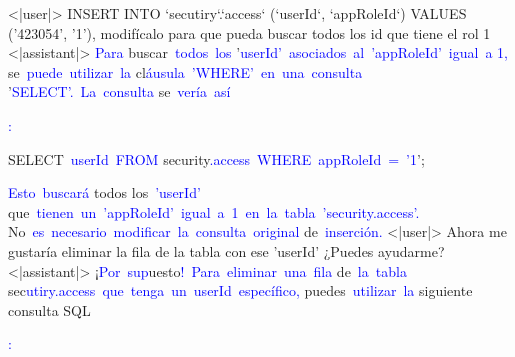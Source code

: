 \documentclass{article}
\begin{document}
\begin{tcolorbox}[colframe=black,colback=white]
<|user|>
INSERT INTO `secutiry`.`access` (`userId`, `appRoleId`) VALUES
('423054', '1'),  modifícalo para que pueda buscar todos los id que tiene el rol 1
<|assistant|>
\textcolor{blue}{Para} buscar\textcolor{blue}{~todos}\textcolor{blue}{~los} '\textcolor{blue}{userId}\textcolor{blue}{'}\textcolor{blue}{~asoci}\textcolor{blue}{ados}\textcolor{blue}{~al}\textcolor{blue}{~'}\textcolor{blue}{app}\textcolor{blue}{RoleId}\textcolor{blue}{'}\textcolor{blue}{~igual}\textcolor{blue}{~a} \textcolor{blue}{1}\textcolor{blue}{,} se\textcolor{blue}{~puede}\textcolor{blue}{~utilizar}\textcolor{blue}{~la} cl\textcolor{blue}{á}\textcolor{blue}{us}\textcolor{blue}{ula}\textcolor{blue}{~'}\textcolor{blue}{WHERE}\textcolor{blue}{'}\textcolor{blue}{~en}\textcolor{blue}{~una}\textcolor{blue}{~consulta} '\textcolor{blue}{SELECT}\textcolor{blue}{'.}\textcolor{blue}{~La}\textcolor{blue}{~consulta} se\textcolor{blue}{~ver}\textcolor{blue}{ía}\textcolor{blue}{~así}\textcolor{blue}{:

}SELECT\textcolor{blue}{~userId}\textcolor{blue}{~FROM} security\textcolor{blue}{.access}\textcolor{blue}{~WHERE}\textcolor{blue}{~app}\textcolor{blue}{RoleId}\textcolor{blue}{~=}\textcolor{blue}{~'}\textcolor{blue}{1}';

\textcolor{blue}{Est}\textcolor{blue}{o}\textcolor{blue}{~buscar}\textcolor{blue}{á} todos los\textcolor{blue}{~'}\textcolor{blue}{userId}\textcolor{blue}{'} que\textcolor{blue}{~tienen}\textcolor{blue}{~un}\textcolor{blue}{~'}\textcolor{blue}{app}\textcolor{blue}{RoleId}\textcolor{blue}{'}\textcolor{blue}{~igual}\textcolor{blue}{~a}\textcolor{blue}{~}\textcolor{blue}{1}\textcolor{blue}{~en}\textcolor{blue}{~la}\textcolor{blue}{~tabla}\textcolor{blue}{~'}\textcolor{blue}{security}\textcolor{blue}{.access}\textcolor{blue}{'.} No\textcolor{blue}{~es}\textcolor{blue}{~necesario}\textcolor{blue}{~modificar}\textcolor{blue}{~la}\textcolor{blue}{~consulta}\textcolor{blue}{~original} de\textcolor{blue}{~inser}\textcolor{blue}{ción}\textcolor{blue}{.}\textcolor{blue}{}\textcolor{blue}{
}<|user|>
Ahora me gustaría eliminar la fila de la tabla con ese 'userId' ¿Puedes ayudarme?
<|assistant|>
¡\textcolor{blue}{Por}\textcolor{blue}{~sup}uesto\textcolor{blue}{!}\textcolor{blue}{~Para}\textcolor{blue}{~eliminar}\textcolor{blue}{~una}\textcolor{blue}{~fila} de\textcolor{blue}{~la}\textcolor{blue}{~tabla} sec\textcolor{blue}{ut}\textcolor{blue}{iry}\textcolor{blue}{.access}\textcolor{blue}{~que}\textcolor{blue}{~tenga}\textcolor{blue}{~un}\textcolor{blue}{~userId}\textcolor{blue}{~específ}\textcolor{blue}{ico}\textcolor{blue}{,} puedes\textcolor{blue}{~utilizar}\textcolor{blue}{~la} siguiente consulta SQL\textcolor{blue}{:

}
\end{tcolorbox}
\end{document}
